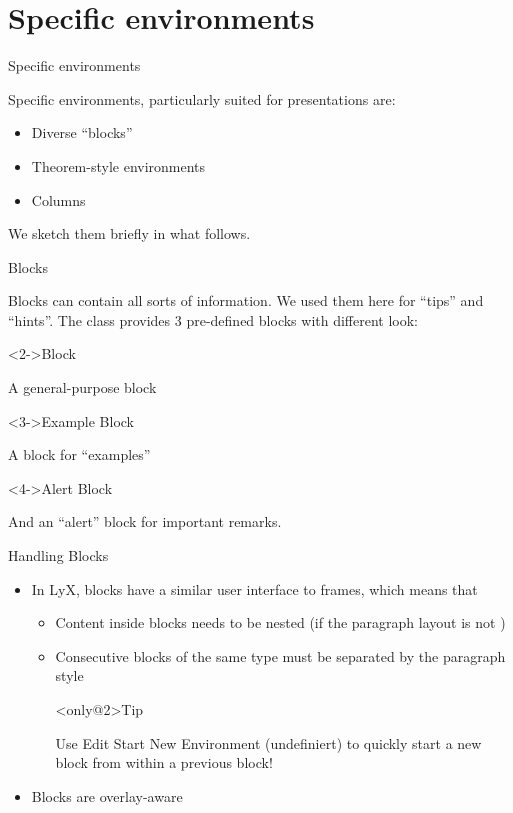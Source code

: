 \documentclass[english]{beamer}
\begin{document}
\section{Specific environments}
\begin{frame}{Specific environments}

Specific environments, particularly suited for presentations are:
\begin{itemize}
\item Diverse ``blocks''
\item Theorem-style environments
\item Columns
\end{itemize}
We sketch them briefly in what follows.
\end{frame}
%
\begin{frame}{Blocks}

Blocks can contain all sorts of information. We used them here for
``tips'' and ``hints''. The class provides 3 pre-defined blocks
with different look:
\begin{block}<2->{Block}

A general-purpose block
\end{block}
\begin{exampleblock}<3->{Example Block}

A block for ``examples''
\end{exampleblock}
\begin{alertblock}<4->{Alert Block}

And an ``alert'' block for important remarks.
\end{alertblock}
\end{frame}
%
\begin{frame}{Handling Blocks}
\begin{itemize}
\item In LyX, blocks have a similar user interface to frames, which means
that
\begin{itemize}
\item Content inside blocks needs to be nested (if the paragraph layout
is not )
\item Consecutive blocks of the same type must be separated by the 
paragraph style
\begin{block}<only@2>{Tip}

Use \alert{Edit \textrightarrow Start New Environment} (\textsf{undefiniert})
to quickly start a new block from within a previous block!
\end{block}
\end{itemize}
\item Blocks are overlay-aware
\end{itemize}
\end{frame}
\end{document}
